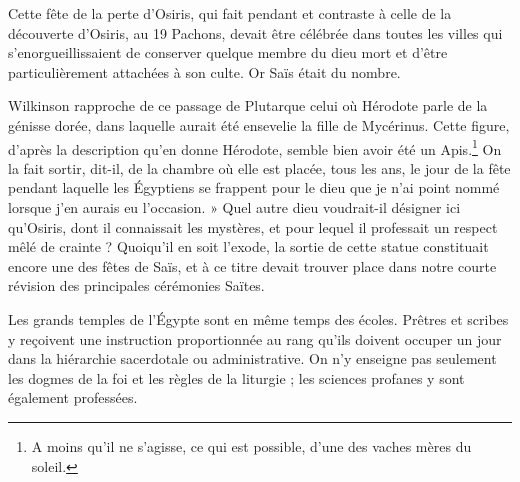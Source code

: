 \documentclass[letterpaper,twocolumn,openany,nodeprecatedcode]{dndbook}
\begin{document}
Cette fête de la perte d'Osiris, qui fait pendant et contraste à celle de la découverte d'Osiris, au 19 Pachons, devait être célébrée dans toutes les villes qui s'enorgueillissaient de conserver quelque membre du dieu mort et d'être particulièrement attachées à son culte. Or Saïs était du nombre.

Wilkinson rapproche de ce passage de Plutarque celui où Hérodote parle de la génisse dorée, dans laquelle aurait été ensevelie la fille de Mycérinus. Cette figure, d'après la description qu'en donne Hérodote, semble bien avoir été un Apis.\footnote{A moins qu'il ne s'agisse, ce qui est possible, d'une des vaches mères du soleil.} On la fait sortir, dit-il, de la chambre où elle est placée, tous les ans, le jour de la fête pendant laquelle les Égyptiens se frappent pour le dieu que je n'ai point nommé lorsque j'en aurais eu l'occasion. » Quel autre dieu voudrait-il désigner ici qu'Osiris, dont il connaissait les mystères, et pour lequel il professait un respect mêlé de crainte ? Quoiqu'il en soit l'exode, la sortie de cette statue constituait encore une des fêtes de Saïs, et à ce titre devait trouver place dans notre courte révision des principales cérémonies Saïtes.

Les grands temples de l'Égypte sont en même temps des écoles. Prêtres et scribes y reçoivent une instruction proportionnée au rang qu'ils doivent occuper un jour dans la hiérarchie sacerdotale ou administrative. On n'y enseigne pas seulement les dogmes de la foi et les règles de la liturgie ; les sciences profanes y sont également professées.
\end{document}
